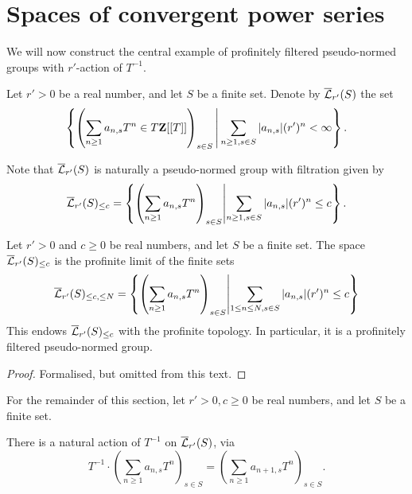 \section{Spaces of convergent power series}

We will now construct the central example of
profinitely filtered pseudo-normed groups with $r'$-action of $T^{-1}$.

\begin{definition}
  \label{Lbar}
  \leanok
  Let $r' > 0$ be a real number, and let $S$ be a finite set.
  Denote by $\overline{\mathcal L}_{r'}(S)$ the set
  \[
    \left\{ \left( \sum_{n \ge 1} a_{n,s} T^n \in T\mathbf{Z}[[T]]\right)_{s \in S} \,\middle\vert\, \sum_{n \ge 1, s \in S} |a_{n,s}| (r')^n < \infty \right\}.
  \]

  Note that $\overline{\mathcal L}_{r'}(S)$ is naturally a pseudo-normed group
  with filtration given by
  \[
    \overline{\mathcal L}_{r'}(S)_{\le c} =
    \left\{ \left( \sum_{n \ge 1} a_{n,s} T^n \right)_{s \in S} \middle\vert \sum_{n \ge 1, s \in S} |a_{n,s}| (r')^n \le c \right\}.
  \]
\end{definition}

\begin{lemma}
  \label{Lbar_profinitely_filtered}
  \leanok
  Let $r' > 0$ and $c \ge 0$ be real numbers, and let $S$ be a finite set.
  The space $\overline{\mathcal L}_{r'}(S)_{\le c}$ is the profinite limit of the finite sets
  \[
    \overline{\mathcal L}_{r'}(S)_{\le c, \le N} =
    \left\{ \left( \sum_{n \ge 1} a_{n,s} T^n \right)_{s \in S} \middle\vert
    \sum_{1 \le n \le N, s \in S} |a_{n,s}| (r')^n \le c \right\}
  \]
  This endows $\overline{\mathcal L}_{r'}(S)_{\le c}$ with the profinite topology.
  In particular, it is a profinitely filtered pseudo-normed group.
\end{lemma}

\begin{proof}
  \leanok
  Formalised, but omitted from this text.
\end{proof}

For the remainder of this section,
let $r' > 0, c \ge 0$ be real numbers,
and let $S$ be a finite set.

\begin{definition}
  \label{Lbar_Tinv}
  \leanok
  There is a natural action of $T^{-1}$ on $\overline{\mathcal L}_{r'}(S)$, via
  \[
    T^{-1} \cdot
    \left( \sum_{n \ge 1} a_{n,s} T^n \right)_{s \in S} =
    \left( \sum_{n \ge 1} a_{n+1,s} T^n \right)_{s \in S}.
  \]
\end{definition}

